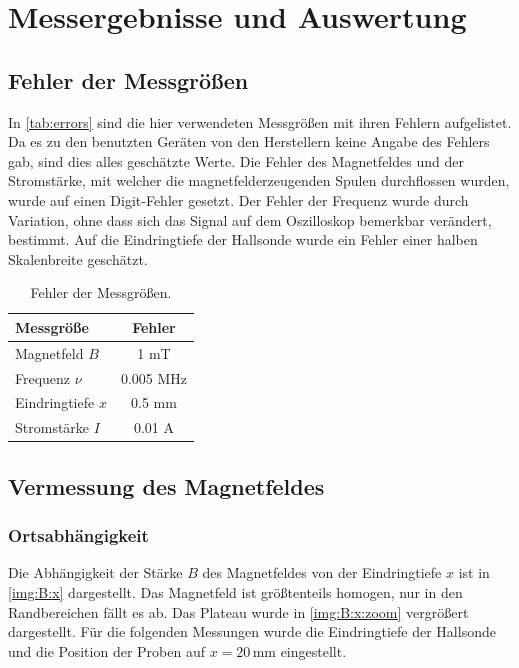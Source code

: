 \section{Messergebnisse und Auswertung}
\subsection{Fehler der Messgrößen}
In \autoref{tab:errors} sind die hier verwendeten Messgrößen mit ihren Fehlern aufgelistet. Da es zu den benutzten Geräten von den Herstellern 
keine Angabe des Fehlers gab, sind dies alles geschätzte Werte. Die Fehler des Magnetfeldes und der Stromstärke, mit welcher die magnetfelderzeugenden 
Spulen durchflossen wurden, wurde auf einen Digit-Fehler gesetzt. Der Fehler der Frequenz wurde durch Variation, ohne dass sich das Signal auf dem 
Oszilloskop bemerkbar verändert, bestimmt. Auf die Eindringtiefe der Hallsonde wurde ein Fehler einer halben Skalenbreite geschätzt.
\begin{table}[H]
\begin{center}
\begin{tabular}{|l|c|}
  \hline
  \textbf{Messgröße} & \textbf{Fehler} \\ \hline
  Magnetfeld $B$ & 1 mT \\ \hline
  Frequenz $\nu$ & 0.005 MHz \\ \hline
  Eindringtiefe $x$ & 0.5 mm \\ \hline
  Stromstärke $I$ & 0.01 A \\ \hline 
\end{tabular}
\caption{Fehler der Messgrößen.}
\label{tab:errors}
\end{center}
\end{table}

\subsection{Vermessung des Magnetfeldes}
\subsubsection{Ortsabhängigkeit}
Die Abhängigkeit der Stärke $B$ des Magnetfeldes von der Eindringtiefe $x$ ist in \autoref{img:B:x} dargestellt. 
Das Magnetfeld ist größtenteils homogen, nur in den Randbereichen fällt es ab. Das Plateau wurde in \autoref{img:B:x:zoom} vergrößert 
dargestellt. Für die folgenden Messungen wurde die Eindringtiefe der Hallsonde und die Position der Proben auf $x=20$\,mm eingestellt.

